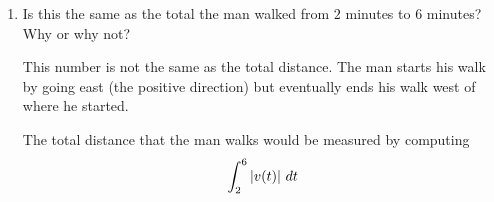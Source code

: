 \documentclass[handout, nooutcomes]{ximera}
\begin{document}
\begin{problem}
\begin{enumerate}
  \item  Is this the same as the total  the man walked from $2$ minutes to $6$ minutes?
    Why or why not?
    \begin{freeResponse}
      This number is not the same as the total distance.
      The man starts his walk by going east (the positive direction) but eventually ends his walk west of where he started.
      
      The total distance that the man walks would be measured by computing 
      $$\int_2^6 \left| v(t) \right| \,d t$$  
    \end{freeResponse}
  \end{enumerate}
\end{problem}
\end{document}
